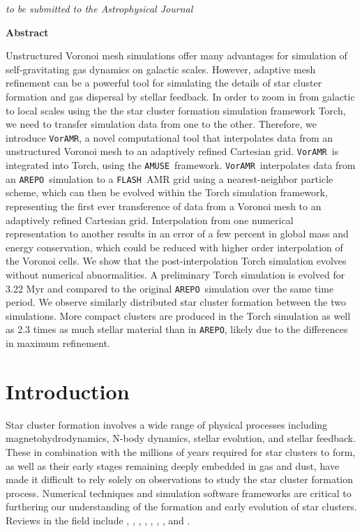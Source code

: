 \documentclass[twoside]{drexel-thesis}
\newcommand\voramr{\texttt{VorAMR}}
\newcommand\flash{\texttt{FLASH}}
\newcommand\amuse{\texttt{AMUSE}}
\newcommand\arepo{\texttt{AREPO}}
\begin{document}
\begin{thesis}
\emph{to be submitted to the Astrophysical Journal}

\centerline{\textbf{Abstract}}

Unstructured Voronoi mesh simulations offer many advantages for simulation of self-gravitating gas dynamics on galactic scales. However, adaptive mesh refinement can be a powerful tool for simulating the details of star cluster formation and gas dispersal by stellar feedback. In order to zoom in from galactic to local scales using the the star cluster formation simulation framework Torch, we need to transfer simulation data from one to the other. Therefore, we introduce \voramr, a novel computational tool that interpolates data from an unstructured Voronoi mesh to an adaptively refined Cartesian grid. \voramr~is integrated into Torch, using the \amuse~framework.  \voramr~interpolates data from an \arepo~simulation to a \flash~AMR grid using a nearest-neighbor particle scheme, which can then be evolved within the Torch simulation framework, representing the first ever transference of data from a Voronoi mesh to an adaptively refined Cartesian grid. Interpolation from one numerical representation to another results in an error of a few percent in global mass and energy conservation, which could be reduced with higher order interpolation of the Voronoi cells. We show that the post-interpolation Torch simulation evolves without numerical abnormalities. A preliminary Torch simulation is evolved for 3.22 Myr and compared to the original \arepo~simulation over the same time period. We observe similarly distributed star cluster formation between the two simulations. More compact clusters are produced in the Torch simulation as well as 2.3 times as much stellar material than in \arepo, likely due to the differences in maximum refinement. 

\section{Introduction}\label{sec:p2-intro}
Star cluster formation involves a wide range of physical processes including magnetohydrodynamics, N-body dynamics, stellar evolution, and stellar feedback.  These in combination with the millions of years required for star clusters to form, as well as their early stages remaining deeply embedded in gas and dust, have made it difficult to rely solely on observations to study the star cluster formation process. Numerical techniques and simulation software frameworks are critical to furthering our understanding of the formation and early evolution of star clusters. Reviews in the field include \citet{mac_low_control_2004}, \citet{mckee_theory_2007}, \citet{portegies_zwart_young_2010}, \citet{dale_modelling_2015}, \citet{klessen_physical_2016}, \citet{krumholz_star_2019}, \citet{girichidis_physical_2020}, and \citet{krause_physics_2020}. 


\end{thesis}
\end{document}
